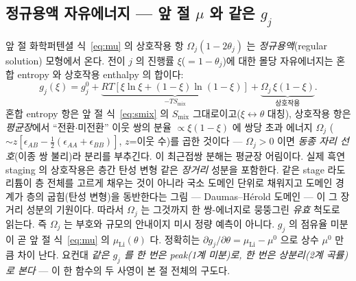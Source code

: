\documentclass[11pt,a4paper]{article}
\begin{document}
\subsection{정규용액 자유에너지 — 앞 절 $\mu$ 와 같은 $g_j$}
앞 절 화학퍼텐셜 식~\eqref{eq:mu} 의 상호작용 항 $\Omega_j(1-2\theta_j)$ 는 \emph{정규용액}(regular solution)
모형에서 온다. 전이 $j$ 의 진행률 $\xi$($=1-\theta_j$)에 대한 몰당 자유에너지는 혼합 entropy 와 상호작용 enthalpy
의 합이다:
\begin{equation}
g_j(\xi)=g_j^0+\underbrace{RT[\xi\ln\xi+(1-\xi)\ln(1-\xi)]}_{-T S_\mathrm{mix}}
+\underbrace{\Omega_j\,\xi(1-\xi)}_{\text{상호작용}}.
\label{eq:regsol_g}
\end{equation}
혼합 entropy 항은 앞 절 식~\eqref{eq:smix} 의 $S_\mathrm{mix}$ 그대로이고($\xi\leftrightarrow\theta$ 대칭), 상호작용
항은 \emph{평균장}에서 ``전환$\cdot$미전환'' 이웃 쌍의 분율 $\propto\xi(1-\xi)$ 에 쌍당 초과 에너지 $\Omega_j$
($\sim z[\epsilon_{AB}-\tfrac12(\epsilon_{AA}+\epsilon_{BB})]$, $z$=이웃 수)를 곱한 것이다 — $\Omega_j>0$ 이면
\emph{동종 자리 선호}(이종 쌍 불리)라 분리를 부추긴다. 이 최근접쌍 분해는 평균장 어림이다. 실제 흑연 staging 의 상호작용은 층간 탄성 변형 같은 \emph{장거리} 성분을 포함한다. 같은 stage 라도 리튬이 층
전체를 고르게 채우는 것이 아니라 국소 도메인 단위로 채워지고 도메인 경계가 층의 굽힘(탄성 변형)을 동반한다는
그림 — Daumas--H\'erold 도메인 — 이 그 장거리 성분의 기원이다. 따라서 $\Omega_j$ 는 그것까지 한 쌍-에너지로 뭉뚱그린 \emph{유효}
척도로 읽는다. 즉 $\Omega_j$ 는 부호와 규모의 안내이지 미시 정량 예측이 아니다. $g_j$ 의 점유율 미분이 곧 앞 절
식~\eqref{eq:mu} 의 $\mu_\mathrm{Li}(\theta)$ 다. 정확히는 $\partial g_j/\partial\theta=\mu_\mathrm{Li}-\mu^0$
으로 상수 $\mu^0$ 만큼 차이 난다. 요컨대 \emph{같은 $g_j$ 를 한 번은 peak(1계 미분)로, 한 번은 상분리(2계 곡률)로
본다} — 이 한 함수의 두 사영이 본 절 전체의 구도다.
\end{document}
